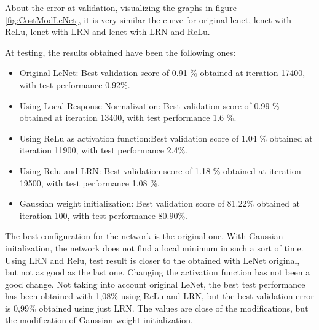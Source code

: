 About the error at validation, visualizing the graphs in figure \ref{fig:CostModLeNet}, it is very similar the curve for original lenet, lenet with ReLu, lenet with LRN and lenet with LRN and ReLu.

At testing, the results obtained have been the following ones:

\begin{itemize}
\item{Original LeNet}: Best validation score of 0.91 \% obtained at iteration 17400, with test performance 0.92\%.
\item{Using Local Response Normalization}: Best validation score of 0.99 \% obtained at iteration 13400, with test performance 1.6 \%.
\item{Using ReLu as activation function}:Best validation score of 1.04 \% obtained at iteration 11900, with test performance 2.4\%.
\item{Using Relu and LRN}: Best validation score of 1.18 \% obtained at iteration 19500, with test performance 1.08 \%.
\item{Gaussian weight initialization}: Best validation score of 81.22\% obtained at iteration 100, with test performance 80.90\%.
\end{itemize}

The best configuration for the network is the original one. With Gaussian initalization, the network does not find a local minimum in such a sort of time. Using LRN and Relu, test result is closer to the obtained with LeNet original, but not as good as the last one. Changing the activation function has not been a good change. Not taking into account original LeNet, the best test performance has been obtained with 1,08\% using ReLu and LRN, but the best validation error is 0,99\% obtained using just LRN. The values are close of the modifications, but the modification of Gaussian weight initialization.\\

\clearpage
